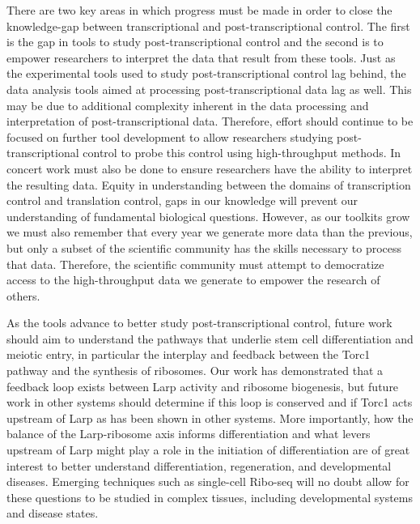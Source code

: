 \documentclass[12pt,oneside]{reedthesis}
\begin{document}
There are two key areas in which progress must be made in order to close the knowledge-gap between transcriptional and post-transcriptional control. The first is the gap in tools to study post-transcriptional control and the second is to empower researchers to interpret the data that result from these tools. Just as the experimental tools used to study post-transcriptional control lag behind, the data analysis tools aimed at processing post-transcriptional data lag as well. This may be due to additional complexity inherent in the data processing and interpretation of post-transcriptional data. Therefore, effort should continue to be focused on further tool development to allow researchers studying post-transcriptional control to probe this control using high-throughput methods. In concert work must also be done to ensure researchers have the ability to interpret the resulting data. Equity in understanding between the domains of transcription control and translation control, gaps in our knowledge will prevent our understanding of fundamental biological questions. However, as our toolkits grow we must also remember that every year we generate more data than the previous, but only a subset of the scientific community has the skills necessary to process that data. Therefore, the scientific community must attempt to democratize access to the high-throughput data we generate to empower the research of others.

As the tools advance to better study post-transcriptional control, future work should aim to understand the pathways that underlie stem cell differentiation and meiotic entry, in particular the interplay and feedback between the Torc1 pathway and the synthesis of ribosomes. Our work has demonstrated that a feedback loop exists between Larp activity and ribosome biogenesis, but future work in other systems should determine if this loop is conserved and if Torc1 acts upstream of Larp as has been shown in other systems. More importantly, how the balance of the Larp-ribosome axis informs differentiation and what levers upstream of Larp might play a role in the initiation of differentiation are of great interest to better understand differentiation, regeneration, and developmental diseases. Emerging techniques such as single-cell Ribo-seq will no doubt allow for these questions to be studied in complex tissues, including developmental systems and disease states.
\end{document}

